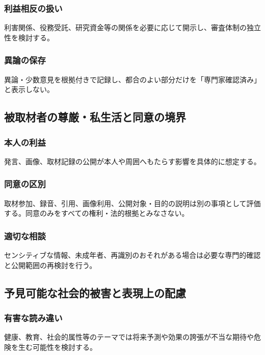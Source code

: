 \documentclass[a4paper,11pt]{article}
\begin{document}
\subsubsection{利益相反の扱い}
\par 利害関係、役務受託、研究資金等の関係を必要に応じて開示し、審査体制の独立性を検討する。\par\medskip
\subsubsection{異論の保存}
\par 異論・少数意見を根拠付きで記録し、都合のよい部分だけを「専門家確認済み」と表示しない。\par\medskip
\subsection{被取材者の尊厳・私生活と同意の境界}
\subsubsection{本人の利益}
\par 発言、画像、取材記録の公開が本人や周囲へもたらす影響を具体的に想定する。\par\medskip
\subsubsection{同意の区別}
\par 取材参加、録音、引用、画像利用、公開対象・目的の説明は別の事項として評価する。同意のみをすべての権利・法的根拠とみなさない。\par\medskip
\subsubsection{適切な相談}
\par センシティブな情報、未成年者、再識別のおそれがある場合は必要な専門的確認と公開範囲の再検討を行う。\par\medskip
\subsection{予見可能な社会的被害と表現上の配慮}
\subsubsection{有害な読み違い}
\par 健康、教育、社会的属性等のテーマでは将来予測や効果の誇張が不当な期待や危険を生む可能性を検討する。\par\medskip
\end{document}
